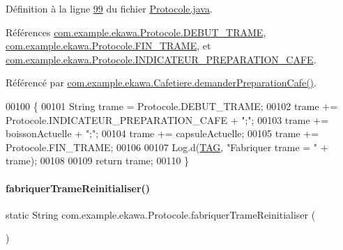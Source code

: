 Définition à la ligne \hyperlink{_protocole_8java_source_l00099}{99} du fichier \hyperlink{_protocole_8java_source}{Protocole.\+java}.



Références \hyperlink{_protocole_8java_source_l00025}{com.\+example.\+ekawa.\+Protocole.\+D\+E\+B\+U\+T\+\_\+\+T\+R\+A\+ME}, \hyperlink{_protocole_8java_source_l00026}{com.\+example.\+ekawa.\+Protocole.\+F\+I\+N\+\_\+\+T\+R\+A\+ME}, et \hyperlink{_protocole_8java_source_l00030}{com.\+example.\+ekawa.\+Protocole.\+I\+N\+D\+I\+C\+A\+T\+E\+U\+R\+\_\+\+P\+R\+E\+P\+A\+R\+A\+T\+I\+O\+N\+\_\+\+C\+A\+FE}.



Référencé par \hyperlink{_cafetiere_8java_source_l00397}{com.\+example.\+ekawa.\+Cafetiere.\+demander\+Preparation\+Cafe()}.


\begin{DoxyCode}
00100     \{
00101         String trame = Protocole.DEBUT\_TRAME;
00102         trame += Protocole.INDICATEUR\_PREPARATION\_CAFE + \textcolor{stringliteral}{";"};
00103         trame += boissonActuelle + \textcolor{stringliteral}{";"};
00104         trame += capsuleActuelle;
00105         trame += Protocole.FIN\_TRAME;
00106 
00107         Log.d(\hyperlink{classcom_1_1example_1_1ekawa_1_1_protocole_ae9b68fa0daac528421b887f19413f8f5}{TAG}, \textcolor{stringliteral}{"Fabriquer trame = "} + trame);
00108 
00109         \textcolor{keywordflow}{return} trame;
00110     \}
\end{DoxyCode}
\mbox{\label{classcom_1_1example_1_1ekawa_1_1_protocole_a7b6e2d90184a17cdf7ee63b350486b3a}} 
\paragraph{\texorpdfstring{fabriquer\+Trame\+Reinitialiser()}{fabriquerTrameReinitialiser()}}
{\footnotesize\ttfamily static String com.\+example.\+ekawa.\+Protocole.\+fabriquer\+Trame\+Reinitialiser (\begin{DoxyParamCaption}{ }\end{DoxyParamCaption})\hspace{0.3cm}{\ttfamily [static]}}



